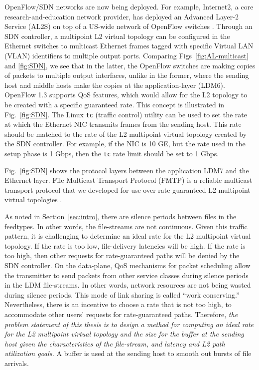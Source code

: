 OpenFlow/SDN networks are now being deployed. For example,
Internet2, a core research-and-education network provider,
has deployed an Advanced Layer-2 Service (AL2S) on top of
a US-wide network of OpenFlow switches \cite{AL2S}.
Through an SDN controller, a multipoint L2 virtual topology can
be configured in the Ethernet switches to multicast Ethernet frames tagged with specific
Virtual LAN (VLAN) identifiers to multiple output ports. Comparing Figs~\ref{fig:AL-multicast} and \ref{fig:SDN}, we see that in the latter,
the OpenFlow switches are making copies of packets to multiple output
interfaces, unlike in the former, where the sending host and
middle hosts make the copies
at the application-layer (LDM6).
OpenFlow 1.3 supports
QoS features, which would allow for the L2 topology to be created with a specific
guaranteed rate. This concept is illustrated in Fig.~\ref{fig:SDN}.
The Linux \texttt{tc} (traffic control) utility can be used to set the rate
at which the Ethernet NIC transmits frames from the sending host. This rate
should be matched to the rate of the L2 multipoint virtual topology created by the
SDN controller. For example, if the NIC is 10 GE, but the rate used
in the setup phase is 1 Gbps, then the \texttt{tc} rate limit should be set to 1 Gbps.

Fig.~\ref{fig:SDN} shows the protocol layers between the application LDM7
and the Ethernet layer. File Multicast Transport Protocol (FMTP) is a reliable multicast transport protocol that we developed for use over rate-guaranteed L2 multipoint virtual topologies \cite{FMTP}.

As noted in Section~\ref{sec:intro}, there are silence periods between files
in the feedtypes. In other words, the file-streams are not continuous. Given
this traffic pattern,
it is challenging to determine an ideal rate for the L2 multipoint virtual topology. If the rate is too low, file-delivery latencies will be high.
If the rate is too high, then other requests for rate-guaranteed paths will be denied by the SDN controller. On the data-plane, QoS mechanisms for packet scheduling
allow the transmitter to send packets from other service classes during silence periods in the LDM file-streams. In other words, network resources are not being wasted during silence periods. This mode of
link sharing is called ``work conserving.'' Nevertheless, there is an incentive to choose a rate that is not too high, to accommodate other users' requests for rate-guaranteed paths. Therefore,
\emph{the problem statement of this thesis is to design a method for computing an ideal rate for the L2 multipoint virtual topology and the size for the buffer at the sending host given the characteristics of the file-stream, and latency and L2 path utilization goals.}
A buffer is used at the sending host to smooth out bursts of file arrivals. 


